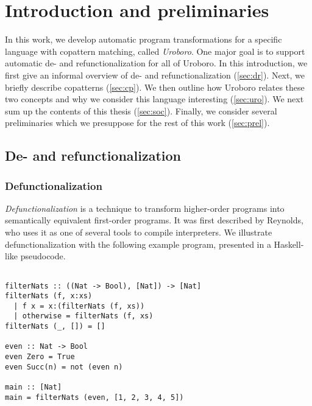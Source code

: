 \chapter{Introduction and preliminaries}

In this work, we develop automatic program transformations for a specific language with copattern matching, called \textit{Uroboro}. One major goal is to support automatic de- and refunctionalization for all of Uroboro. In this introduction, we first give an informal overview of de- and refunctionalization (\autoref{sec:dr}). Next, we briefly describe copatterns (\autoref{sec:cp}). We then outline how Uroboro relates these two concepts and why we consider this language interesting (\autoref{sec:uro}). We next sum up the contents of this thesis (\autoref{sec:soc}). Finally, we consider several preliminaries which we presuppose for the rest of this work (\autoref{sec:prel}).

\section{De- and refunctionalization}
\label{sec:dr}

\subsection{Defunctionalization}

\textit{Defunctionalization} is a technique to transform higher-order programs into semantically equivalent first-order programs. It was first described by Reynolds, who uses it as one of several tools to compile interpreters. We illustrate defunctionalization with the following example program, presented in a Haskell-like pseudocode.

\begin{lstlisting}

filterNats :: ((Nat -> Bool), [Nat]) -> [Nat]
filterNats (f, x:xs)
  | f x = x:(filterNats (f, xs))
  | otherwise = filterNats (f, xs)
filterNats (_, []) = []

even :: Nat -> Bool
even Zero = True
even Succ(n) = not (even n)

main :: [Nat]
main = filterNats (even, [1, 2, 3, 4, 5])

\end{lstlisting}

